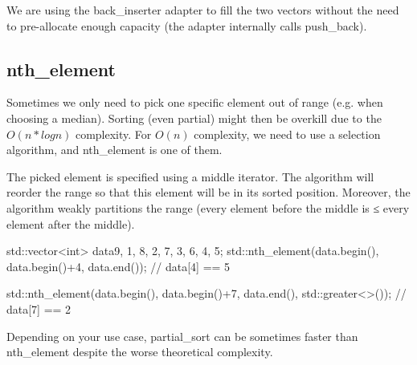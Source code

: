 \begin{box-note}
\end{box-note}

We are using the back\_inserter adapter to fill the two vectors without the need to pre-allocate enough capacity (the adapter internally calls push\_back).

\subsection{nth\_element}

Sometimes we only need to pick one specific element out of range (e.g. when choosing a median). Sorting (even partial) might then be overkill due to the $O(n*logn)$ complexity. For $O(n)$ complexity, we need to use a selection algorithm, and nth\_element is one of them.



The picked element is specified using a middle iterator. The algorithm will reorder the range so that this element will be in its sorted position. Moreover, the algorithm weakly partitions the range (every element before the middle is ≤ every element after the middle).

\begin{box-note}
\begin{cppcode}
std::vector<int> data{9, 1, 8, 2, 7, 3, 6, 4, 5};
std::nth_element(data.begin(), data.begin()+4, data.end());
// data[4] == 5

std::nth_element(data.begin(), data.begin()+7, data.end(), std::greater<>());
// data[7] == 2
\end{cppcode}
\end{box-note}

Depending on your use case, partial\_sort can be sometimes faster than nth\_element despite the worse theoretical complexity.

